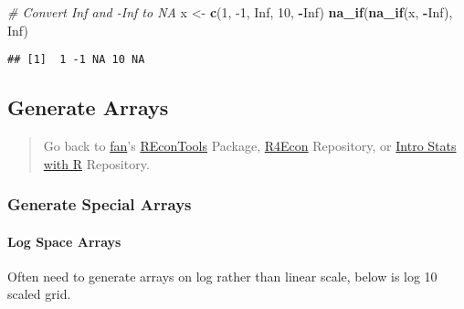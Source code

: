 \documentclass[
]{book}
\newenvironment{Shaded}{\begin{snugshade}}{\end{snugshade}}
\newcommand{\CommentTok}[1]{\textcolor[rgb]{0.56,0.35,0.01}{\textit{#1}}}
\newcommand{\DecValTok}[1]{\textcolor[rgb]{0.00,0.00,0.81}{#1}}
\newcommand{\KeywordTok}[1]{\textcolor[rgb]{0.13,0.29,0.53}{\textbf{#1}}}
\newcommand{\NormalTok}[1]{#1}
\newcommand{\OperatorTok}[1]{\textcolor[rgb]{0.81,0.36,0.00}{\textbf{#1}}}
\newcommand{\OtherTok}[1]{\textcolor[rgb]{0.56,0.35,0.01}{#1}}
\newcommand{\StringTok}[1]{\textcolor[rgb]{0.31,0.60,0.02}{#1}}
\begin{document}
\begin{Shaded}
\begin{Highlighting}[]
\CommentTok{# Convert Inf and -Inf to NA}
\NormalTok{x <-}\StringTok{ }\KeywordTok{c}\NormalTok{(}\DecValTok{1}\NormalTok{, }\DecValTok{-1}\NormalTok{, }\OtherTok{Inf}\NormalTok{, }\DecValTok{10}\NormalTok{, }\OperatorTok{-}\OtherTok{Inf}\NormalTok{)}
\KeywordTok{na_if}\NormalTok{(}\KeywordTok{na_if}\NormalTok{(x, }\OperatorTok{-}\OtherTok{Inf}\NormalTok{), }\OtherTok{Inf}\NormalTok{)}
\end{Highlighting}
\end{Shaded}

\begin{verbatim}
## [1]  1 -1 NA 10 NA
\end{verbatim}

\hypertarget{generate-arrays}{%
\subsection{Generate Arrays}\label{generate-arrays}}

\begin{quote}
Go back to \href{http://fanwangecon.github.io/CodeDynaAsset/}{fan}'s \href{https://fanwangecon.github.io/REconTools/}{REconTools} Package, \href{https://fanwangecon.github.io/R4Econ/}{R4Econ} Repository, or \href{https://fanwangecon.github.io/Stat4Econ/}{Intro Stats with R} Repository.
\end{quote}

\hypertarget{generate-special-arrays}{%
\subsubsection{Generate Special Arrays}\label{generate-special-arrays}}

\hypertarget{log-space-arrays}{%
\paragraph{Log Space Arrays}\label{log-space-arrays}}

Often need to generate arrays on log rather than linear scale, below is log 10 scaled grid.
\end{document}
